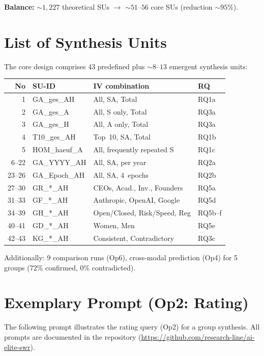 \documentclass[12pt,a4paper]{article}
\begin{document}
\textbf{Balance:} ${\sim}1{,}227$ theoretical SUs $\to$ ${\sim}51$--$56$ core SUs (reduction ${\sim}95$\%).


\section{List of Synthesis Units}
\label{app:se}

The core design comprises 43 predefined plus ${\sim}8$--$13$ emergent synthesis units:

{\small
\begin{tabular}{@{} r L{3.2cm} L{7.4cm} L{2.0cm} @{}}
  \toprule
  \textbf{No} & \textbf{SU-ID} & \textbf{IV combination} & \textbf{RQ} \\
   & GA\_ges\_AH & All, SA, Total & RQ1a \\
  2 & GA\_ges\_A & All, S only, Total & RQ3a \\
  3 & GA\_ges\_H & All, A only, Total & RQ3a \\
  4 & T10\_ges\_AH & Top~10, SA, Total & RQ1b \\
  5 & HOM\_haeuf\_A & All, frequently repeated S & RQ1c \\
  6--22 & GA\_YYYY\_AH & All, SA, per year & RQ2a \\
  23--26 & GA\_Epoch\_AH & All, SA, 4~epochs & RQ2b \\
  27--30 & GR\_*\_AH & CEOs, Acad., Inv., Founders & RQ5a \\
  31--33 & GF\_*\_AH & Anthropic, OpenAI, Google & RQ5d \\
  34--39 & GH\_*\_AH & Open/Closed, Risk/Speed, Reg & RQ5b--f \\
  40--41 & GD\_*\_AH & Women, Men & RQ5e \\
  42--43 & KG\_*\_AH & Consistent, Contradictory & RQ3c \\
  \bottomrule
\end{tabular}
}

Additionally: 9 comparison runs (Op6), cross-modal prediction (Op4) for 5 groups (72\% confirmed, 0\% contradicted).


\section{Exemplary Prompt (Op2: Rating)}
\label{app:prompt}

The following prompt illustrates the rating query (Op2) for a group synthesis. All prompts are documented in the repository (\url{https://github.com/research-line/ai-elite-swr}).
\end{document}
